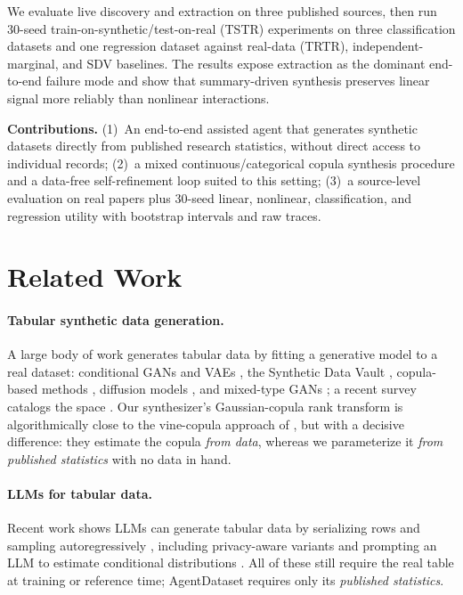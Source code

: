 \documentclass[letterpaper]{article} %
\begin{document}
We evaluate live discovery and extraction on three published sources, then run
30-seed train-on-synthetic/test-on-real (TSTR) experiments on three
classification datasets and one regression dataset against real-data (TRTR),
independent-marginal, and SDV baselines. The results expose extraction as the
dominant end-to-end failure mode and show that summary-driven synthesis
preserves linear signal more reliably than nonlinear interactions.

\textbf{Contributions.} (1)~An end-to-end assisted agent that generates
synthetic datasets directly from published research statistics, without direct
access to individual records; (2)~a mixed continuous/categorical copula synthesis
procedure and a data-free self-refinement loop suited to this setting;
(3)~a source-level evaluation on real papers plus 30-seed linear, nonlinear,
classification, and regression utility with bootstrap intervals and raw traces.

\section{Related Work}
\label{sec:related}

\paragraph{Tabular synthetic data generation.}
A large body of work generates tabular data by fitting a generative model to a
real dataset: conditional GANs and VAEs \citep{xu2019ctgan}, the Synthetic Data
Vault \citep{patki2016sdv}, copula-based methods \citep{sun2019vinecopula},
diffusion models \citep{kotelnikov2023tabddpm}, and mixed-type GANs
\citep{zhao2021ctabgan}; a recent survey catalogs the space \citep{shi2025survey}.
Our synthesizer's Gaussian-copula rank transform is algorithmically close to the
vine-copula approach of \citet{sun2019vinecopula}, but with a decisive
difference: they estimate the copula \emph{from data}, whereas we parameterize it
\emph{from published statistics} with no data in hand.

\paragraph{LLMs for tabular data.}
Recent work shows LLMs can generate tabular data by serializing rows and sampling
autoregressively \citep{borisov2023great,zhao2023tabula}, including
privacy-aware variants \citep{wang2024harmonic} and prompting an LLM to estimate
conditional distributions \citep{sidorenko2025statacc}. All of these still
require the real table at training or reference time; AgentDataset requires only
its \emph{published statistics}.
\end{document}

